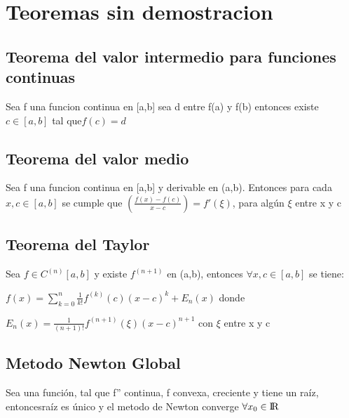 \documentclass{article}
\begin{document}
\section{Teoremas sin demostracion}\label{Teoremas}


\subsection{Teorema del valor intermedio para funciones continuas}\label{valor-intermedio}

Sea f una funcion continua en [a,b] sea d entre f(a) y f(b) entonces existe $c \in [a,b]$ tal que$f(c)=d $

 \vspace{5mm}

\subsection{Teorema del valor medio}\label{valor-medio}

Sea f una funcion continua en [a,b] y derivable en (a,b). Entonces para cada $x,c \in [a,b]$ se cumple
que $\left( \displaystyle\frac{f(x)-f(c)}{x-c} \right) = f'(\xi) $, para algún $\xi$ entre x y c

 \vspace{5mm}




\subsection{Teorema del Taylor}\label{Taylor}

Sea $f \in C^{(n)}[a,b]$ y existe $f^{(n+1)}$ en (a,b), entonces $\forall x,c \in [a,b]$ se tiene:

$f(x) = \sum\limits_{k=0}^{n} \frac{1}{k!} f^{(k)}(c)(x-c)^k+E_n(x)$ donde

$E_n(x) = \frac{1}{(n+1)!} f^{(n+1)}(\xi)(x-c)^{n+1}$ con $\xi$ entre x y c


 \vspace{5mm}

\subsection{Metodo Newton Global}\label{Metodo-Newton-Global}

Sea una función, tal que f'' continua, f convexa, creciente y tiene un raíz, entoncesraíz es único y el metodo de Newton
converge $ \forall x_0 \in {\rm I\!R} $
\end{document}
